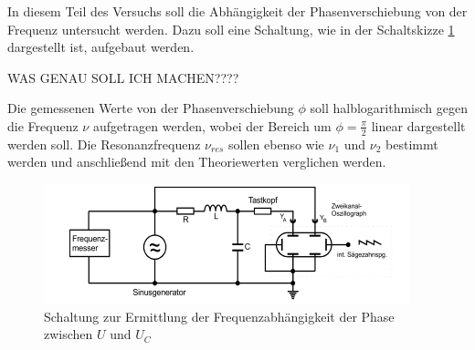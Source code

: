 In diesem Teil des Versuchs soll die Abhängigkeit der Phasenverschiebung von der Frequenz untersucht werden.
Dazu soll eine Schaltung, wie in der Schaltskizze \ref{fig:gsk5} dargestellt ist, aufgebaut werden.



WAS GENAU SOLL ICH MACHEN????

Die gemessenen Werte von der Phasenverschiebung $\phi$ soll halblogarithmisch gegen die Frequenz $\nu$
aufgetragen werden, wobei der Bereich um $\phi = \frac{\pi}{2}$ linear dargestellt werden soll.
Die Resonanzfrequenz $\nu_{res}$ sollen ebenso wie $\nu_1$ und $\nu_2$ bestimmt werden und anschließend
mit den Theoriewerten verglichen werden. 

\begin{figure}[H]
  \centering
  \includegraphics{content/aufgabeD.png}
  \caption{Schaltung zur Ermittlung der Frequenzabhängigkeit der Phase zwischen $U$ und $U_C$}
  \label{fig:gsk5}
\end{figure}
